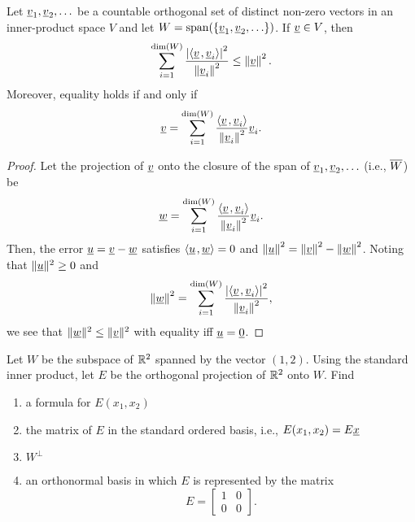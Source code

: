 \begin{corollary}
Let $\underline{v}_1, \underline{v}_2, \ldots$ be a countable orthogonal set of distinct non-zero vectors in an inner-product space $V$ and let $W = \mathrm{span}(\{ \underline{v}_1, \underline{v}_2, \ldots\})$.
If $\underline{v} \in V$, then
\begin{equation*}
\sum_{i=1}^{\dim (W)} \frac{ \left| {\left\langle  \underline{v}  \mskip2mu ,  \underline{v}_i  \right\rangle} \right|^2 }{ \left\| \underline{v}_i \right\|^2 }
\leq \left\| \underline{v} \right\|^2.
\end{equation*}
Moreover, equality holds if and only if
\begin{equation*}
\underline{v} = \sum_{i=1}^{\dim (W)} \frac{ {\left\langle  \underline{v}  \mskip2mu ,  \underline{v}_i  \right\rangle} }{ \left\| \underline{v}_i \right\|^2 } \underline{v}_i.
\end{equation*}
\end{corollary}
\begin{proof}
Let the projection of $\underline{v}$ onto the closure of the span of $\underline{v}_1,\underline{v}_2,\ldots$ (i.e., $\overline{W}$) be
\begin{equation*}
\underline{w} = \sum_{i=1}^{\dim (W)} \frac{ {\left\langle  \underline{v}  \mskip2mu ,  \underline{v}_i  \right\rangle} }{ \left\| \underline{v}_i \right\|^2 } \underline{v}_i.
\end{equation*}
Then, the error $\underline{u} = \underline{v} - \underline{w}$ satisfies  ${\left\langle  \underline{u}  \mskip2mu ,  \underline{w}  \right\rangle} = 0$ and $\left\| \underline{u} \right\|^2 = \left\| \underline{v} \right\|^2 - \left\| \underline{w} \right\|^2$.
Noting that $\| \underline{u} \|^2 \geq 0$ and 
\begin{equation*}
\left\| \underline{w} \right\|^2
= \sum_{i=1}^{\dim (W)} \frac{ \left| {\left\langle  \underline{v}  \mskip2mu ,  \underline{v}_i  \right\rangle} \right|^2 }{ \left\| \underline{v}_i \right\|^2 },
\end{equation*}
we see that $\| \underline{w} \|^2 \leq \| \underline{v} \|^2$ with equality iff $\underline{u} = \underline{0}$.
\end{proof}


\begin{problem}
Let $W$ be the subspace of $\mathbb{R}^2$ spanned by the vector $(1,2)$.
Using the standard inner product, let $E$ be the orthogonal projection of $\mathbb{R}^2$ onto $W$.
Find
\begin{enumerate}
\item a formula for $E(x_1, x_2)$
\item the matrix of $E$ in the standard ordered basis, i.e., $E(x_1, x_2) = E \underline{x}$
\item $W^{\bot}$
\item an orthonormal basis in which $E$ is represented by the matrix
\begin{equation*}
E = \begin{bmatrix} 1 & 0 \\ 0 & 0 \end{bmatrix} .
\end{equation*}
\end{enumerate}
\end{problem}

